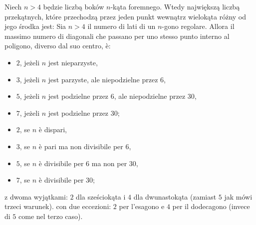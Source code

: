 \begin{proposition}
Niech $n > 4$ będzie liczbą boków $n$-kąta foremnego. %
Wtedy największą liczbą przekątnych, które przechodzą przez jeden punkt wewnątrz wielokąta różny od jego środka jest: %
Sia $n > 4$ il numero di lati di un $n$-gono regolare. %
Allora il massimo numero di diagonali che passano per uno stesso punto interno al poligono, diverso dal suo centro, è: %
\begin{itemize}
\item $2$, jeżeli $n$ jest nieparzyste, %
\item $3$, jeżeli $n$ jest parzyste, ale niepodzielne przez $6$, %
\item $5$, jeżeli $n$ jest podzielne przez $6$, ale niepodzielne przez $30$, %
\item $7$, jeżeli $n$ jest podzielne przez $30$; %
\item $2$, se $n$ è dispari, %
\item $3$, se $n$ è pari ma non divisibile per $6$, %
\item $5$, se $n$ è divisibile per $6$ ma non per $30$, %
\item $7$, se $n$ è divisibile per $30$; %
\end{itemize}
z dwoma wyjątkami: $2$ dla sześciokąta i $4$ dla dwunastokąta (zamiast $5$ jak mówi trzeci warunek). %
con due eccezioni: $2$ per l'esagono e $4$ per il dodecagono (invece di $5$ come nel terzo caso). %
\end{proposition}

%